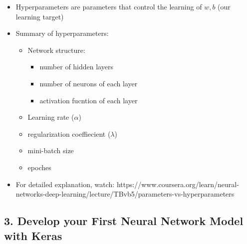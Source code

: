 \documentclass[11pt]{article}
\providecommand{\tightlist}{%
      \setlength{\itemsep}{0pt}\setlength{\parskip}{0pt}}
\begin{document}
\begin{itemize}
\tightlist
\item
  Hyperparameters are parameters that control the learning of \(w, b\)
  (our learning target)
\item
  Summary of hyperparameters:

  \begin{itemize}
  \tightlist
  \item
    Network structure:

    \begin{itemize}
    \tightlist
    \item
      number of hidden layers
    \item
      number of neurons of each layer
    \item
      activation fucntion of each layer
    \end{itemize}
  \item
    Learning rate (\(\alpha\))
  \item
    regularization coeffiecient (\(\lambda\))
  \item
    mini-batch size
  \item
    epoches
  \end{itemize}
\item
  For detailed explanation, watch:
  https://www.coursera.org/learn/neural-networks-deep-learning/lecture/TBvb5/parameters-vs-hyperparameters
\end{itemize}

    \hypertarget{develop-your-first-neural-network-model-with-keras}{%
\subsection{3. Develop your First Neural Network Model with
Keras}\label{develop-your-first-neural-network-model-with-keras}}
\end{document}
